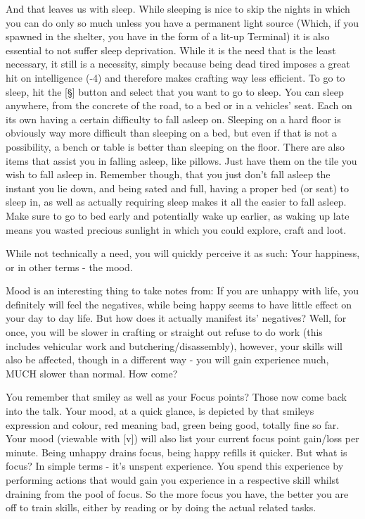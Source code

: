 \documentclass[11pt]{report}
\begin{document}
And that leaves us with sleep. While sleeping is nice to skip the nights in which you can do only so much unless you have a permanent light source (Which, if you spawned in the shelter, you have in the form of a lit-up Terminal) it is also essential to not suffer sleep deprivation. While it is the need that is the least necessary, it still is a necessity, simply because being dead tired imposes a great hit on intelligence (-4) and therefore makes crafting way less efficient. To go to sleep, hit the [\S] button and select that you want to go to sleep. You can sleep anywhere, from the concrete of the road, to a bed or in a vehicles' seat. Each on its own having a certain difficulty to fall asleep on. Sleeping on a hard floor is obviously way more difficult than sleeping on a bed, but even if that is not a possibility, a bench or table is better than sleeping on the floor. There are also items that assist you in falling asleep, like pillows. Just have them on the tile you wish to fall asleep in. Remember though, that you just don't fall asleep the instant you lie down, and being sated and full, having a proper bed (or seat) to sleep in, as well as actually requiring sleep makes it all the easier to fall asleep. Make sure to go to bed early and potentially wake up earlier, as waking up late means you wasted precious sunlight in which you could explore, craft and loot.

While not technically a need, you will quickly perceive it as such: Your happiness, or in other terms - the mood.

Mood is an interesting thing to take notes from: If you are unhappy with life, you definitely will feel the negatives, while being happy seems to have little effect on your day to day life. But how does it actually manifest its' negatives? Well, for once, you will be slower in crafting or straight out refuse to do work (this includes vehicular work and butchering/disassembly), however, your skills will also be affected, though in a different way - you will gain experience much, MUCH slower than normal. How come?

You remember that smiley as well as your Focus points? Those now come back into the talk. Your mood, at a quick glance, is depicted by that smileys expression and colour, red meaning bad, green being good, totally fine so far. Your mood (viewable with [v]) will also list your current focus point gain/loss per minute. Being unhappy drains focus, being happy refills it quicker. But what is focus? In simple terms - it's unspent experience. You spend this experience by performing actions that would gain you experience in a respective skill whilst draining from the pool of focus. So the more focus you have, the better you are off to train skills, either by reading or by doing the actual related tasks.
\end{document}
